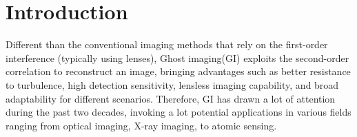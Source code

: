 \documentclass[amsmath,amssymb,aps,prl,groupedaddress,floatfix,12pt]{revtex4-1}
\begin{document}
\pacs{}

\maketitle

\section{Introduction}
Different than the conventional imaging methods that rely on the first-order interference (typically using lenses), Ghost imaging(GI) exploits the second-order correlation to reconstruct an image\cite{Pittman1995}, bringing advantages such as better resistance to turbulence\cite{yang_lensless_2016}, high detection sensitivity\cite{morris2015imaging,UltraHighSpeedGI}, lensless imaging capability\cite{scarcelli2006can}, and broad adaptability for different scenarios\cite{Peng2015The,Liu2017Computational,Aspden2015Photon}. Therefore, GI has drawn a lot of attention during the past two decades, invoking a lot potential applications in various fields ranging from optical imaging\cite{gong2016three}, X-ray imaging\cite{pelliccia2016experimental,yu2016fourier,zhang2018tabletop}, to atomic sensing\cite{khakimov2016ghost,baldwin2017ghost}. 
\end{document}
